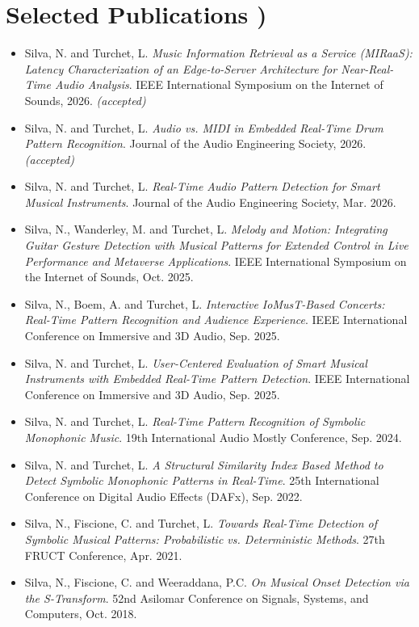 \documentclass[11pt]{article}
\begin{document}
\section*{Selected Publications \footnotesize {)}}
\begin{itemize}[leftmargin=1.2em, itemsep=-0.25em]
    \item Silva, N. and Turchet, L. \textit{Music Information Retrieval as a Service (MIRaaS): Latency Characterization of an Edge-to-Server Architecture for Near-Real-Time Audio Analysis}. IEEE International Symposium on the Internet of Sounds, 2026. \textit{(accepted)}
    \item Silva, N. and Turchet, L. \textit{Audio vs. MIDI in Embedded Real-Time Drum Pattern Recognition}. Journal of the Audio Engineering Society, 2026. \textit{(accepted)}
    \item Silva, N. and Turchet, L. \textit{Real-Time Audio Pattern Detection for Smart Musical Instruments}. Journal of the Audio Engineering Society, Mar. 2026. 
    \item Silva, N., Wanderley, M. and Turchet, L. \textit{Melody and Motion: Integrating Guitar Gesture Detection with Musical Patterns for Extended Control in Live Performance and Metaverse Applications}. IEEE International Symposium on the Internet of Sounds, Oct. 2025.
    \item Silva, N., Boem, A. and Turchet, L. \textit{Interactive IoMusT-Based Concerts: Real-Time Pattern Recognition and Audience Experience}. IEEE International Conference on Immersive and 3D Audio, Sep. 2025.
    \item Silva, N. and Turchet, L. \textit{User-Centered Evaluation of Smart Musical Instruments with Embedded Real-Time Pattern Detection}. IEEE International Conference on Immersive and 3D Audio, Sep. 2025.
    \item Silva, N. and Turchet, L. \textit{Real-Time Pattern Recognition of Symbolic Monophonic Music}. 19th International Audio Mostly Conference, Sep. 2024.
    \item Silva, N. and Turchet, L. \textit{A Structural Similarity Index Based Method to Detect Symbolic Monophonic Patterns in Real-Time}. 25th International Conference on Digital Audio Effects (DAFx), Sep. 2022.
    \item Silva, N., Fiscione, C. and Turchet, L. \textit{Towards Real-Time Detection of Symbolic Musical Patterns: Probabilistic vs. Deterministic Methods}. 27th FRUCT Conference, Apr. 2021.
    \item Silva, N., Fiscione, C. and Weeraddana, P.C. \textit{On Musical Onset Detection via the S-Transform}. 52nd Asilomar Conference on Signals, Systems, and Computers, Oct. 2018.
\end{itemize}
\end{document}
